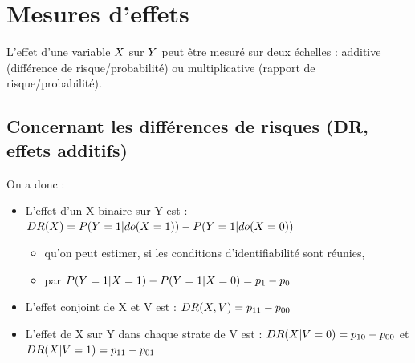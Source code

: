 \documentclass[
]{book}
\providecommand{\tightlist}{%
  \setlength{\itemsep}{0pt}\setlength{\parskip}{0pt}}
\begin{document}
\hypertarget{mesures-deffets}{%
\section{Mesures d'effets}\label{mesures-deffets}}

L'effet d'une variable \(\small X\) sur \(\small Y\) peut être mesuré sur deux échelles : additive (différence de risque/probabilité) ou multiplicative (rapport de risque/probabilité).

\hypertarget{concernant-les-diffuxe9rences-de-risques-dr-effets-additifs}{%
\subsection*{Concernant les différences de risques (DR, effets additifs)}\label{concernant-les-diffuxe9rences-de-risques-dr-effets-additifs}}

On a donc :

\begin{itemize}
\tightlist
\item
  L'effet d'un X binaire sur Y est : \(\small DR(X) = P(Y = 1|do(X = 1)) - P(Y = 1|do(X = 0))\)

  \begin{itemize}
  \tightlist
  \item
    qu'on peut estimer, si les conditions d'identifiabilité sont réunies,
  \item
    par \(\small P(Y = 1|X = 1) - P(Y = 1|X = 0) = p_1-p_0\)
  \end{itemize}
\item
  L'effet conjoint de X et V est : \(\small DR(X,V) = p_{11}-p_{00}\)
\item
  L'effet de X sur Y dans chaque strate de V est : \(\small DR(X|V=0) = p_{10}-p_{00}\) et \(\small DR(X|V=1) = p_{11}-p_{01}\)
\end{itemize}
\end{document}
